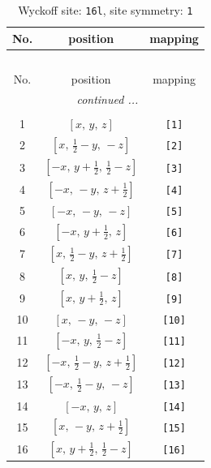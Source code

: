 \documentclass[fleqn,8pt]{jsarticle}
\begin{document}
\begin{longtable}{ccc}
\caption{Wyckoff site: {\tt 16l}, site symmetry: {\tt 1}}
 \\
 \hline \hline
No. & position & mapping \\ \hline \endfirsthead

\multicolumn{2}{l}{\tablename\ \thetable{}} \\
 \hline \hline
No. & position & mapping \\ \hline \endhead

 \hline \hline
\multicolumn{2}{r}{\footnotesize\it continued ...} \\ \endfoot

 \hline \hline
\multicolumn{2}{r}{} \\ \endlastfoot

1 & $\left[ x,\, y,\, z \right]$ & {\tt [1]} \\ \hline
2 & $\left[ x,\, \frac{1}{2} - y,\, - z \right]$ & {\tt [2]} \\ \hline
3 & $\left[ - x,\, y + \frac{1}{2},\, \frac{1}{2} - z \right]$ & {\tt [3]} \\ \hline
4 & $\left[ - x,\, - y,\, z + \frac{1}{2} \right]$ & {\tt [4]} \\ \hline
5 & $\left[ - x,\, - y,\, - z \right]$ & {\tt [5]} \\ \hline
6 & $\left[ - x,\, y + \frac{1}{2},\, z \right]$ & {\tt [6]} \\ \hline
7 & $\left[ x,\, \frac{1}{2} - y,\, z + \frac{1}{2} \right]$ & {\tt [7]} \\ \hline
8 & $\left[ x,\, y,\, \frac{1}{2} - z \right]$ & {\tt [8]} \\ \hline
9 & $\left[ x,\, y + \frac{1}{2},\, z \right]$ & {\tt [9]} \\ \hline
10 & $\left[ x,\, - y,\, - z \right]$ & {\tt [10]} \\ \hline
11 & $\left[ - x,\, y,\, \frac{1}{2} - z \right]$ & {\tt [11]} \\ \hline
12 & $\left[ - x,\, \frac{1}{2} - y,\, z + \frac{1}{2} \right]$ & {\tt [12]} \\ \hline
13 & $\left[ - x,\, \frac{1}{2} - y,\, - z \right]$ & {\tt [13]} \\ \hline
14 & $\left[ - x,\, y,\, z \right]$ & {\tt [14]} \\ \hline
15 & $\left[ x,\, - y,\, z + \frac{1}{2} \right]$ & {\tt [15]} \\ \hline
16 & $\left[ x,\, y + \frac{1}{2},\, \frac{1}{2} - z \right]$ & {\tt [16]} \\
\end{longtable}
\end{document}
